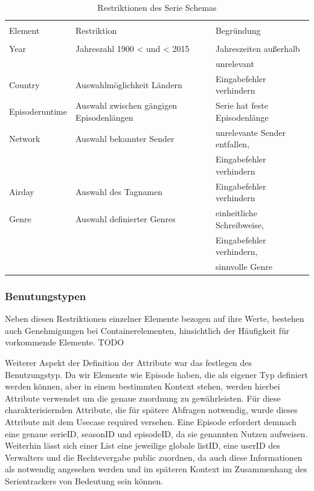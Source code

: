 \documentclass[a4paper]{article}
\begin{document}
\begin{table}[H]
\caption{Restriktionen des Serie Schemas}


\begin{tabular}{l l l}
\\ [-0.5ex]

\hline\hline
\\ [-0.5ex]
Element & Restriktion & Begründung
\\ [1.5ex]
\hline
\\ [-0.5ex]
Year & Jahreszahl 1900 < und < 2015 & Jahreszeiten außerhalb\\[1ex]
&&unrelevant \\[3ex]

Country & Auswahlmöglichkeit Ländern & Eingabefehler verhindern\\[3ex]
Episoderuntime & Auswahl zwischen gängigen Episodenlängen& Serie hat feste Episodenlänge\\[3ex]
Network & Auswahl bekannter Sender & unrelevante Sender entfallen,\\[3ex]
&&Eingabefehler verhindern\\[3ex]

Airday & Auswahl des Tagnamen & Eingabefehler verhindern\\[3ex]
Genre & Auswahl definierter Genres & einheitliche Schreibweise,\\[1ex]
&&Eingabefehler verhindern,\\[1ex]
&& sinnvolle Genre\\[2ex]

\hline
\end{tabular}
\label{tab:restriktionenderxsd}
\end{table}



\subsubsection{Benutungstypen}

Neben diesen Restriktionen einzelner Elemente bezogen auf ihre Werte, bestehen auch Genehmigungen bei Containerelementen, hinsichtlich der Häufigkeit für vorkommende Elemente. TODO

Weiterer Aspekt der Definition der Attribute war das festlegen des Benutzungstyp. Da wir Elemente wie Episode haben, die als eigener Typ definiert werden können, aber in einem bestimmten Kontext stehen, werden hierbei Attribute verwendet um die genaue zuordnung zu gewährleisten. Für diese charakterisiernden Attribute, die für spätere Abfragen notwendig, wurde dieses Attribute mit dem Usecase required versehen. Eine Episode erfordert demnach eine genaue serieID, seasonID und episodeID, da sie genannten Nutzen aufweisen. Weiterhin lässt sich einer List eine jeweilige globale listID, eine userID des Verwalters und die Rechtevergabe public zuordnen, da auch diese Informationen als notwendig angesehen werden und im späteren Kontext im Zusammenhang des Serientrackers von Bedeutung sein können. 
\end{document}
